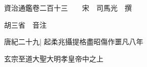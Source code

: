 






























































資治通鑑卷二百十三　　宋　司馬光　撰

胡三省　音注

唐紀二十九|{
	起柔兆攝提格盡昭傷作噩凡八年}


玄宗至道大聖大明孝皇帝中之上


